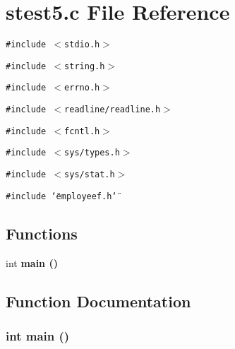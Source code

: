 \section{stest5.c File Reference}
\label{stest5_8c}
{\tt \#include $<$stdio.h$>$}\par
{\tt \#include $<$string.h$>$}\par
{\tt \#include $<$errno.h$>$}\par
{\tt \#include $<$readline/readline.h$>$}\par
{\tt \#include $<$fcntl.h$>$}\par
{\tt \#include $<$sys/types.h$>$}\par
{\tt \#include $<$sys/stat.h$>$}\par
{\tt \#include \char`\"{}employeef.h\char`\"{}}\par
\subsection*{Functions}
\begin{CompactItemize}
\item 
int \bf{main} ()
\end{CompactItemize}


\subsection{Function Documentation}
\subsubsection{\setlength{\rightskip}{0pt plus 5cm}int main ()}\label{stest5_8c_446c6b9a1a4dbab517fbb760870458a3}


